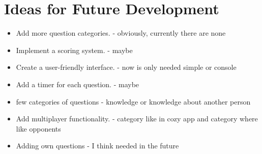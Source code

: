 \documentclass[a4paper,12pt]{article}
\begin{document}
\section{Ideas for Future Development}
\begin{itemize}
    \item Add more question categories. - obviously, currently there are none
    \item Implement a scoring system. - maybe
    \item Create a user-friendly interface. - now is only needed simple or console
    \item Add a timer for each question. - maybe
    \item few categories of questions - knowledge or knowledge about another person
    \item Add multiplayer functionality. - category like in cozy app and category where like opponents
    \item Adding own questions - I think needed in the future
\end{itemize}
\end{document}
